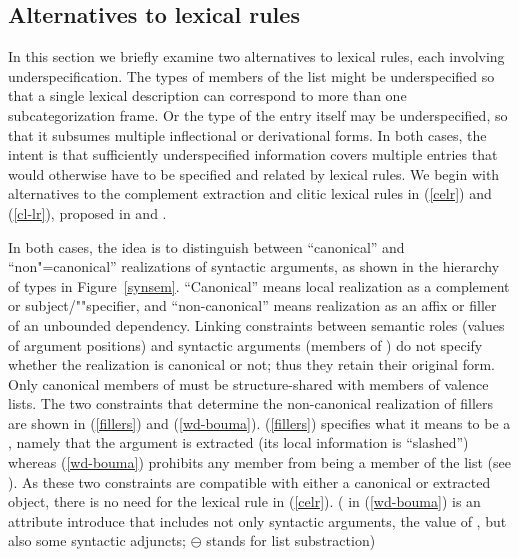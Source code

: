 \documentclass[output=paper
 	        ,biblatex
                ,babelshorthands
                ,newtxmath
                ,draftmode
                ,colorlinks, citecolor=brown
]{langscibook}
\begin{document}
\subsection{Alternatives to lexical rules}
\label{sec:alt}

In this section we briefly examine two alternatives to lexical rules, each involving underspecification. The types of members of the  list might be underspecified so that a single lexical description can correspond to more than one subcategorization frame. Or the type of the entry itself may be underspecified, so that it subsumes multiple inflectional or derivational forms. In both cases, the intent is that sufficiently underspecified information covers multiple entries that would otherwise have to be specified and related by lexical rules. We begin with alternatives to the complement extraction and clitic lexical rules in (\ref{celr}) and (\ref{cl-lr}), proposed in  and .%

In both cases, the idea is to distinguish between ``canonical'' and ``non"=canonical'' realizations of syntactic arguments, as shown in the hierarchy of  types in Figure~\ref{synsem}. ``Canonical'' means local realization as a complement or subject/""specifier, and ``non-canonical'' means realization as an affix or filler of an unbounded dependency. Linking constraints between semantic roles (values of argument positions) and syntactic arguments (members of ) do not specify whether the realization is canonical or not; thus they retain their original form. Only canonical members of  must be structure-shared with members of valence lists. The two constraints that determine the non-canonical realization of fillers are shown in (\ref{fillers}) and (\ref{wd-bouma}). (\ref{fillers}) specifies what it means to be a , namely that the argument is extracted (its local information is ``slashed'') whereas (\ref{wd-bouma}) prohibits any  member from being a member of the  list (see \citealt[23]{Boumaetal2001}). As these two constraints are compatible with either a canonical or extracted object, there is no need for the lexical rule in (\ref{celr}). ( in (\ref{wd-bouma}) is an attribute \citeauthor{Boumaetal2001} introduce that includes not only syntactic arguments, the value of , but also some syntactic adjuncts; $\ominus$ stands for list substraction)
\end{document}

